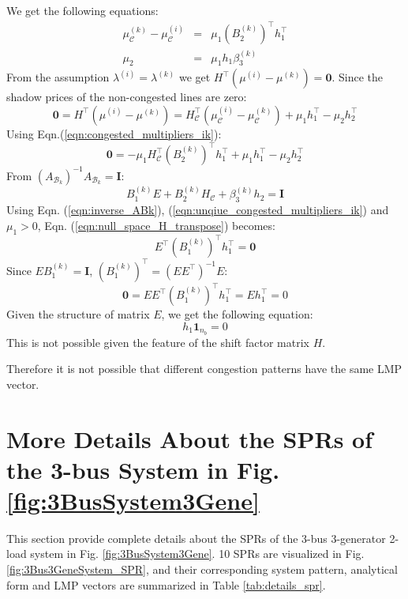 \documentclass[letterpaper, 11pt]{article}
\theoremstyle{plain}
\theoremstyle{definition}
\begin{document}
We get the following equations:
\begin{eqnarray}
  \mu_{\mathcal{C}}^{(k)} - \mu_{\mathcal{C}}^{(i)} &=& \mu_1 (B_2^{(k)})^\intercal h_1^\intercal \label{eqn:congested_multipliers_ik} \\
  \mu_2 &=& \mu_1 h_1 \beta_3^{(k)} \label{eqn:unqiue_congested_multipliers_ik} 
\end{eqnarray}
From the assumption $\lambda^{(i)} = \lambda^{(k)}$ we get $H^\intercal (\mu^{(i)} - \mu^{(k)}) = \mathbf{0}$. Since the shadow prices of the non-congested lines are zero:
\begin{equation}
\label{eqn:zero_congestion_diff}
  \mathbf{0} = H^\intercal (\mu^{(i)} - \mu^{(k)})
  = H_{\mathcal{C}}^\intercal (\mu_{\mathcal{C}}^{(i)} - \mu_{\mathcal{C}}^{(k)}) 
  + \mu_1 h_1^\intercal - \mu_2 h_2^\intercal 
\end{equation}
Using Eqn.(\ref{eqn:congested_multipliers_ik}):
\begin{equation}
\label{eqn:null_space_H_transpose}
  \mathbf{0}  = -\mu_1 H_{\mathcal{C}}^\intercal (B_2^{(k)})^\intercal h_1^\intercal + \mu_1 h_1^\intercal - \mu_2 h_2^\intercal
\end{equation}
From $(A_{\mathcal{B}_k})^{-1}A_{\mathcal{B}_k} = \mathbf{I}$:
\begin{equation}
\label{eqn:inverse_ABk}
  B_1^{(k)}E + B_2^{(k)}H_{\mathcal{C}} + \beta_3^{(k)}h_2 = \mathbf{I}
\end{equation}
Using Eqn. (\ref{eqn:inverse_ABk}), (\ref{eqn:unqiue_congested_multipliers_ik}) and $\mu_1 > 0$, Eqn. (\ref{eqn:null_space_H_transpose}) becomes:
\begin{equation}
  E^\intercal (B_1^{(k)})^\intercal h_1^\intercal = \mathbf{0}
\end{equation}
Since $E B_1^{(k)} = \mathbf{I}$, $(B_1^{(k)})^\intercal = (E E^\intercal)^{-1} E$:
\begin{equation}
  \mathbf{0} = E E^\intercal (B_1^{(k)})^\intercal h_1^\intercal = E h_1^\intercal = 0
\end{equation}
Given the structure of matrix $E$, we get the following equation:
\begin{equation}
  h_1 \mathbf{1}_{n_b} = 0
\end{equation}
This is not possible given the feature of the shift factor matrix $H$.


Therefore it is not possible that different congestion patterns have the same LMP vector.


\section{More Details About the SPRs of the 3-bus System in Fig. \ref{fig:3BusSystem3Gene} } \label{sec:analytical_form_of_the_sprs_of_the_3_bus_system_in_fig_}
This section provide complete details about the SPRs of the 3-bus 3-generator 2-load system in Fig. \ref{fig:3BusSystem3Gene}.
10 SPRs are visualized in Fig. \ref{fig:3Bus3GeneSystem_SPR}, and their corresponding system pattern, analytical form and LMP vectors are summarized in Table \ref{tab:details_spr}.
\end{document}

